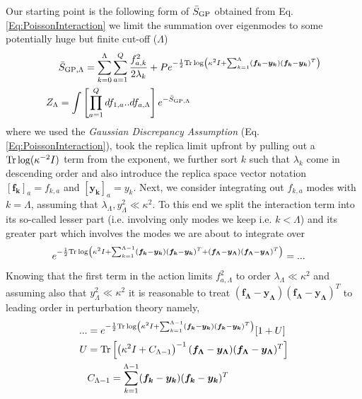 Our starting point is the following form of $\bar{S}_{\text{GP}}$ obtained from Eq. \ref{Eq:PoissonInteraction} we limit the summation over eigenmodes to some potentially huge but finite cut-off ($\Lambda$)
\begin{align}
\label{Eq:SLambda}
&\bar{S}_{\text{GP},\Lambda} = \sum_{k=0}^{\Lambda} \sum_{a=1}^Q \frac{f_{a,k}^2}{2\lambda_k} +P e^{-\frac{1}{2} \text{Tr}\log\left(\kappa^2 I+ \sum_{k=1}^{\Lambda} (\bm{f_k}-\bm{y_k})(\bm{f_k}-\bm{y_k})^T\right)} \\ \nonumber 
Z_{\Lambda} &=  \int \left[\prod_{a=1}^Q df_{1,a}..df_{a,\Lambda}\right] e^{-\bar{S}_{\text{GP},\Lambda}}
\end{align}
where we used the {\it Gaussian Discrepancy Assumption} (Eq. \ref{Eq:PoissonInteraction}), took the replica limit upfront by pulling out a $\text{Tr}\log(\kappa^{-2} I)$ term from the exponent, we further sort $k$ such that $\lambda_k$ come in descending order and also introduce the replica space vector notation $[\bm{f_k}]_a=f_{k,a}$ and $[\bm{y_k}]_a=y_k.$ 
Next, we consider integrating out $f_{k,a}$ modes with $k = \Lambda$, assuming that $\lambda_{\Lambda},y^2_{\Lambda}\ll \kappa^2$. To this end we split the interaction term into its so-called lesser part (i.e. involving only modes we keep i.e. $k < \Lambda$) and its greater part which involves the modes we are about to integrate over
\begin{align}
e^{-\frac{1}{2}\text{Tr}\log\left(\kappa^2 I+ \sum_{k=1}^{\Lambda-1} (\bm{f_k}-\bm{y_k})(\bm{f_k}-\bm{y_k})^T+(\bm{f_{\Lambda}}-\bm{y_{\Lambda}})(\bm{f_{\Lambda}}-\bm{y_{\Lambda}})^T\right)} &= ...
\end{align}
Knowing that the first term in the action limits $f_{a,\Lambda}^2$ to order $\lambda_{\Lambda} \ll \kappa^2$ and assuming also that $y^2_{\Lambda} \ll \kappa^2$ it is reasonable to treat $(\bm{f_{\Lambda}}-\bm{y_{\Lambda}})(\bm{f_{\Lambda}}-\bm{y_{\Lambda}})^T$ to leading order in perturbation theory namely, 
\begin{align}
\label{Eq:RGTaylorExpansion}
... &= e^{-\frac{1}{2} \text{Tr}\log\left(\kappa^2 I+ \sum_{k=1}^{\Lambda-1} (\bm{f_k}-\bm{y_k})(\bm{f_k}-\bm{y_k})^T\right)}[1 + U] \\ \nonumber 
U &= \text{Tr}\left[\left(\kappa^2 I+ C_{\Lambda-1}
\right)^{-1}(\bm{f_{\Lambda}}-\bm{y_{\Lambda}})(\bm{f_{\Lambda}}-\bm{y_{\Lambda}})^T \right]
\\\nonumber 
&C_{\Lambda-1} = \sum_{k=1}^{\Lambda-1} (\bm{f_k}-\bm{y_k})(\bm{f_k}-\bm{y_k})^T
\end{align}
